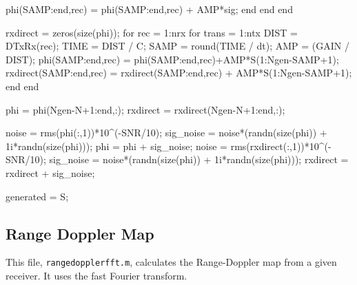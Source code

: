 \documentclass[12pt,openany,a4paper]{book}
\begin{document}
\begin{spverbatim}
            phi(SAMP:end,rec) = phi(SAMP:end,rec) + AMP*sig;
        end
    end
end

rxdirect = zeros(size(phi));
for rec = 1:nrx
    for trans = 1:ntx
        DIST = DTxRx(rec);
        TIME = DIST / C;
        SAMP = round(TIME / dt); %
        AMP = (GAIN / DIST); %
        phi(SAMP:end,rec) = phi(SAMP:end,rec)+AMP*S(1:Ngen-SAMP+1);
        rxdirect(SAMP:end,rec) = rxdirect(SAMP:end,rec) + AMP*S(1:Ngen-SAMP+1);
    end
end

phi = phi(Ngen-N+1:end,:);
rxdirect = rxdirect(Ngen-N+1:end,:);

noise = rms(phi(:,1))*10^(-SNR/10);
sig_noise = noise*(randn(size(phi)) + 1i*randn(size(phi)));
phi = phi + sig_noise;
noise = rms(rxdirect(:,1))*10^(-SNR/10);
sig_noise = noise*(randn(size(phi)) + 1i*randn(size(phi)));
rxdirect = rxdirect + sig_noise;

generated = S;
\end{spverbatim}

\subsection{Range Doppler Map}
This file, \verb+rangedopplerfft.m+, calculates the Range-Doppler map from a given receiver. It uses the fast Fourier transform.
\end{document}
